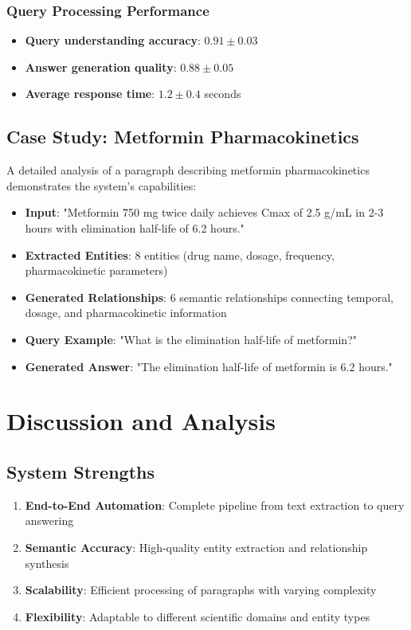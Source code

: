 \documentclass[conference]{IEEEtran}
\begin{document}
\subsubsection{Query Processing Performance}
\begin{itemize}
\item \textbf{Query understanding accuracy}: $0.91 \pm 0.03$
\item \textbf{Answer generation quality}: $0.88 \pm 0.05$
\item \textbf{Average response time}: $1.2 \pm 0.4$ seconds
\end{itemize}

\subsection{Case Study: Metformin Pharmacokinetics}
A detailed analysis of a paragraph describing metformin pharmacokinetics demonstrates the system's capabilities:
\begin{itemize}
\item \textbf{Input}: "Metformin 750 mg twice daily achieves Cmax of 2.5
 g/mL in 2-3 hours with elimination half-life of 6.2 hours."
\item \textbf{Extracted Entities}: 8 entities (drug name, dosage, frequency, pharmacokinetic parameters)
\item \textbf{Generated Relationships}: 6 semantic relationships connecting temporal, dosage, and pharmacokinetic information
\item \textbf{Query Example}: "What is the elimination half-life of metformin?"
\item \textbf{Generated Answer}: "The elimination half-life of metformin is 6.2 hours."
\end{itemize}

\section{Discussion and Analysis}

\subsection{System Strengths}
\begin{enumerate}
\item \textbf{End-to-End Automation}: Complete pipeline from text extraction to query answering
\item \textbf{Semantic Accuracy}: High-quality entity extraction and relationship synthesis
\item \textbf{Scalability}: Efficient processing of paragraphs with varying complexity
\item \textbf{Flexibility}: Adaptable to different scientific domains and entity types
\end{enumerate}
\end{document}
